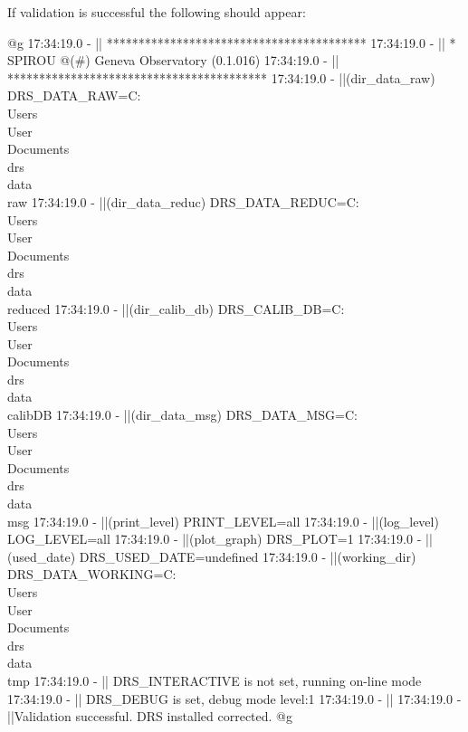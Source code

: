 \noindent If validation is successful the following should appear:
\begin{cmdboxprintspecial}
@g
17:34:19.0 -   || *****************************************
17:34:19.0 -   || * SPIROU @(#) Geneva Observatory (0.1.016)
17:34:19.0 -   || *****************************************
17:34:19.0 -   ||(dir_data_raw)      DRS_DATA_RAW=C:\\Users\\User\\Documents\\drs\\data\\raw
17:34:19.0 -   ||(dir_data_reduc)    DRS_DATA_REDUC=C:\\Users\\User\\Documents\\drs\\data\\reduced
17:34:19.0 -   ||(dir_calib_db)      DRS_CALIB_DB=C:\\Users\\User\\Documents\\drs\\data\\calibDB
17:34:19.0 -   ||(dir_data_msg)      DRS_DATA_MSG=C:\\Users\\User\\Documents\\drs\\data\\msg
17:34:19.0 -   ||(print_level)       PRINT_LEVEL=all         %
17:34:19.0 -   ||(log_level)         LOG_LEVEL=all         %
17:34:19.0 -   ||(plot_graph)        DRS_PLOT=1            %
17:34:19.0 -   ||(used_date)         DRS_USED_DATE=undefined
17:34:19.0 -   ||(working_dir)       DRS_DATA_WORKING=C:\\Users\\User\\Documents\\drs\\data\\tmp
17:34:19.0 -   ||                    DRS_INTERACTIVE is not set, running on-line mode
17:34:19.0 -   ||                    DRS_DEBUG is set, debug mode level:1
17:34:19.0 -   ||
17:34:19.0 -   ||Validation successful. DRS installed corrected.
@g
\end{cmdboxprintspecial}



